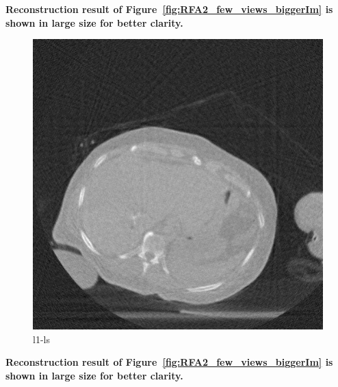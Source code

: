 \documentclass{article}
\begin{document}
\newpage
\textbf{Reconstruction result of Figure~\ref{fig:RFA2_few_views_biggerIm}   is shown in large size for better clarity.}\\
\begin{figure}[!h]
\centering
\includegraphics[width=1.2\columnwidth]{../images/tmh/RFA2/few_views/cs_dct.png}
\captionsetup{labelformat=empty}
\caption[Representative results-2]{\large{l1-ls}}
\label{fig:RFA2_few_views_bigger}
\end{figure}
\newpage
\textbf{Reconstruction result of Figure~\ref{fig:RFA2_few_views_biggerIm}  is shown in large size for better clarity.}\\
\end{document}
